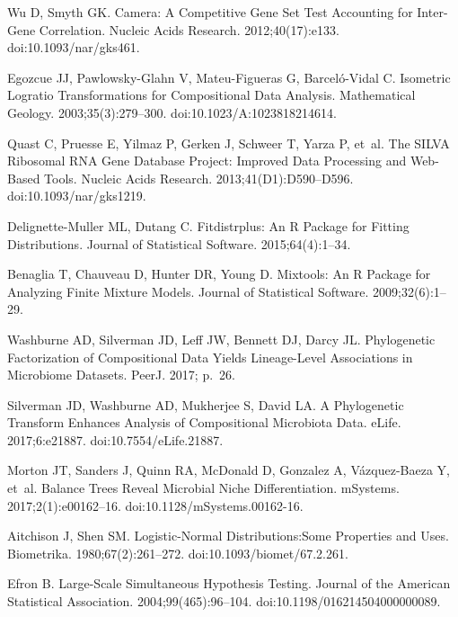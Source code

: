 \documentclass[10pt,letterpaper]{article}
\begin{document}
\begin{thebibliography}{10}
Wu D, Smyth GK.
\newblock Camera: A Competitive Gene Set Test Accounting for Inter-Gene
  Correlation.
\newblock Nucleic Acids Research. 2012;40(17):e133.
\newblock doi:{10.1093/nar/gks461}.

Egozcue JJ, {Pawlowsky-Glahn} V, {Mateu-Figueras} G, {Barcel{\'o}-Vidal} C.
\newblock Isometric {{Logratio Transformations}} for {{Compositional Data
  Analysis}}.
\newblock Mathematical Geology. 2003;35(3):279--300.
\newblock doi:{10.1023/A:1023818214614}.

Quast C, Pruesse E, Yilmaz P, Gerken J, Schweer T, Yarza P, et~al.
\newblock The {{SILVA}} Ribosomal {{RNA}} Gene Database Project: Improved Data
  Processing and Web-Based Tools.
\newblock Nucleic Acids Research. 2013;41(D1):D590--D596.
\newblock doi:{10.1093/nar/gks1219}.

{Delignette-Muller} ML, Dutang C.
\newblock Fitdistrplus: An {{R}} Package for Fitting Distributions.
\newblock Journal of Statistical Software. 2015;64(4):1--34.

Benaglia T, Chauveau D, Hunter DR, Young D.
\newblock Mixtools: An {{R}} Package for Analyzing Finite Mixture Models.
\newblock Journal of Statistical Software. 2009;32(6):1--29.

Washburne AD, Silverman JD, Leff JW, Bennett DJ, Darcy JL.
\newblock Phylogenetic Factorization of Compositional Data Yields Lineage-Level
  Associations in Microbiome Datasets.
\newblock PeerJ. 2017; p.~26.

Silverman JD, Washburne AD, Mukherjee S, David LA.
\newblock A Phylogenetic Transform Enhances Analysis of Compositional
  Microbiota Data.
\newblock eLife. 2017;6:e21887.
\newblock doi:{10.7554/eLife.21887}.

Morton JT, Sanders J, Quinn RA, McDonald D, Gonzalez A, {V{\'a}zquez-Baeza} Y,
  et~al.
\newblock Balance {{Trees Reveal Microbial Niche Differentiation}}.
\newblock mSystems. 2017;2(1):e00162--16.
\newblock doi:{10.1128/mSystems.00162-16}.

Aitchison J, Shen SM.
\newblock Logistic-Normal Distributions:Some Properties and Uses.
\newblock Biometrika. 1980;67(2):261--272.
\newblock doi:{10.1093/biomet/67.2.261}.

Efron B.
\newblock Large-{{Scale Simultaneous Hypothesis Testing}}.
\newblock Journal of the American Statistical Association.
  2004;99(465):96--104.
\newblock doi:{10.1198/016214504000000089}.


\end{thebibliography}
\end{document}
